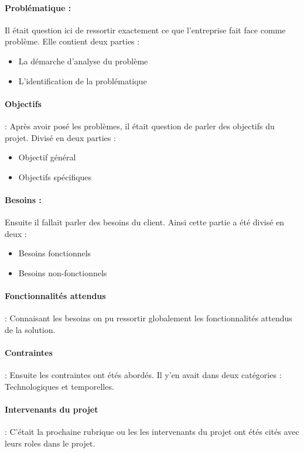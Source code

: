 \paragraph{Problématique :} Il était question ici de ressortir exactement ce que l’entreprise fait face comme problème. Elle contient deux parties :
\begin{itemize}
    \item La démarche d’analyse du problème
    \item L'identification de la problématique
\end{itemize} 

\paragraph{Objectifs} : Après avoir posé les problèmes, il était question de parler des objectifs du projet. Divisé en deux parties :
\begin{itemize}
    \item Objectif général
    \item Objectifs spécifiques
\end{itemize}

\paragraph{Besoins :} Ensuite il fallait parler des besoins du client. Ainsi cette partie a été divisé en deux :
\begin{itemize}
    \item Besoins fonctionnels
    \item Besoins non-fonctionnels
\end{itemize}

\paragraph{Fonctionnalités attendus} : Connaisant les besoins on pu ressortir globalement les fonctionnalités attendus de la solution.

\paragraph{Contraintes} : Ensuite les contraintes ont étés abordés. Il y'en avait dans deux catégories : Technologiques et temporelles.

\paragraph{Intervenants du projet} : C'était la prochaine rubrique ou les les intervenants du projet ont étés cités avec leurs roles dans le projet.


